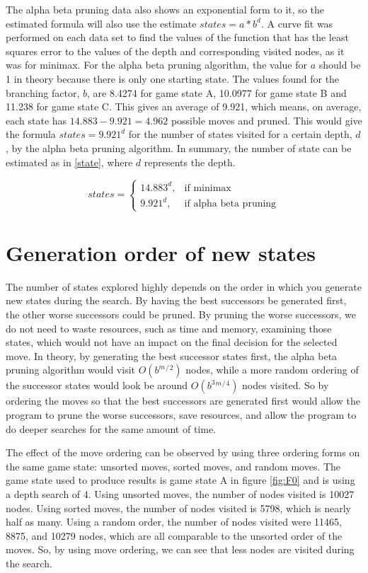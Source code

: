 \documentclass[11pt]{scrartcl}
\begin{document}
The alpha beta pruning data also shows an exponential form to it, so the estimated formula will also use the estimate $ states = a*b^d $. A curve fit was performed on each data set to find the values of the function that has the least squares error to the  values of the depth and corresponding visited nodes, as it was for minimax. For the alpha beta pruning algorithm, the value for $a$ should be 1 in theory because there is only one starting state. The values found for the branching factor, $b$, are 8.4274 for game state A, 10.0977 for game state B and 11.238 for game state C. This gives an average of 9.921, which means, on average, each state has $14.883-9.921=4.962$ possible moves and pruned. This would give the formula $ states = 9.921^d $ for the number of states visited for a certain depth, $d$, by the alpha beta pruning algorithm. In summary, the number of state can be estimated as in \eqref{state}, where $d$ represents the depth.

\begin{equation}
states = 
\begin{cases}
    14.883^d, &\text{if minimax}\\
    9.921^d, &\text{if alpha beta pruning}
\end{cases}
\label{state}
\end{equation} 

\section{Generation order of new states}
The number of states explored highly depends on the order in which you generate new states during the search. By having the best successors be generated first, the other worse successors could be pruned. By pruning the worse successors, we do not need to waste resources, such as time and memory, examining those states, which would not have an impact on the final decision for the selected move. In theory, by generating the best successor states first, the alpha beta pruning algorithm would visit $O(b^m{}^/{}^2)$ nodes, while a more random ordering of the successor states would look be around $O(b^3{}^m{}^/{}^4)$ nodes visited. So by ordering the moves so that the best successors are generated first would allow the program to prune the worse successors, save resources, and allow the program to do deeper searches for the same amount of time. 

The effect of the move ordering can be observed by using three ordering forms on the same game state: unsorted moves, sorted moves, and random moves. The game state used to produce results is game state A in figure \ref{fig:F0} and is using a depth search of 4. Using unsorted moves, the number of nodes visited is 10027 nodes. Using sorted moves, the number of nodes visited is 5798, which is nearly half as many. Using a random order, the number of nodes visited were 11465, 8875, and 10279 nodes, which are all comparable to the unsorted order of the moves. So, by using move ordering, we can see that less nodes are visited during the search.
\end{document}
